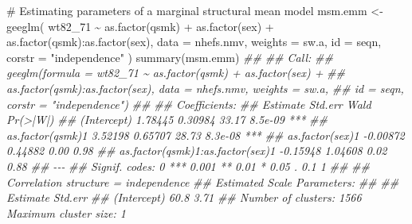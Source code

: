 \documentclass[
  10pt,
  a4paper,
]{book}
\newenvironment{Shaded}{\begin{snugshade}}{\end{snugshade}}
\newcommand{\AttributeTok}[1]{\textcolor[rgb]{0.40,0.45,0.13}{#1}}
\newcommand{\CommentTok}[1]{\textcolor[rgb]{0.37,0.37,0.37}{#1}}
\newcommand{\DocumentationTok}[1]{\textcolor[rgb]{0.37,0.37,0.37}{\textit{#1}}}
\newcommand{\FunctionTok}[1]{\textcolor[rgb]{0.28,0.35,0.67}{#1}}
\newcommand{\NormalTok}[1]{\textcolor[rgb]{0.00,0.46,0.62}{#1}}
\newcommand{\OtherTok}[1]{\textcolor[rgb]{0.00,0.46,0.62}{#1}}
\newcommand{\SpecialCharTok}[1]{\textcolor[rgb]{0.37,0.37,0.37}{#1}}
\newcommand{\StringTok}[1]{\textcolor[rgb]{0.13,0.47,0.30}{#1}}
\begin{document}
\begin{Shaded}
\begin{Highlighting}[]
\CommentTok{\# Estimating parameters of a marginal structural mean model}
\NormalTok{msm.emm }\OtherTok{\textless{}{-}} \FunctionTok{geeglm}\NormalTok{(}
\NormalTok{  wt82\_71 }\SpecialCharTok{\textasciitilde{}} \FunctionTok{as.factor}\NormalTok{(qsmk) }\SpecialCharTok{+} \FunctionTok{as.factor}\NormalTok{(sex)}
  \SpecialCharTok{+} \FunctionTok{as.factor}\NormalTok{(qsmk)}\SpecialCharTok{:}\FunctionTok{as.factor}\NormalTok{(sex),}
  \AttributeTok{data =}\NormalTok{ nhefs.nmv,}
  \AttributeTok{weights =}\NormalTok{ sw.a,}
  \AttributeTok{id =}\NormalTok{ seqn,}
  \AttributeTok{corstr =} \StringTok{"independence"}
\NormalTok{)}
\FunctionTok{summary}\NormalTok{(msm.emm)}
\DocumentationTok{\#\# }
\DocumentationTok{\#\# Call:}
\DocumentationTok{\#\# geeglm(formula = wt82\_71 \textasciitilde{} as.factor(qsmk) + as.factor(sex) + }
\DocumentationTok{\#\#     as.factor(qsmk):as.factor(sex), data = nhefs.nmv, weights = sw.a, }
\DocumentationTok{\#\#     id = seqn, corstr = "independence")}
\DocumentationTok{\#\# }
\DocumentationTok{\#\#  Coefficients:}
\DocumentationTok{\#\#                                  Estimate  Std.err  Wald Pr(\textgreater{}|W|)    }
\DocumentationTok{\#\# (Intercept)                       1.78445  0.30984 33.17  8.5e{-}09 ***}
\DocumentationTok{\#\# as.factor(qsmk)1                  3.52198  0.65707 28.73  8.3e{-}08 ***}
\DocumentationTok{\#\# as.factor(sex)1                  {-}0.00872  0.44882  0.00     0.98    }
\DocumentationTok{\#\# as.factor(qsmk)1:as.factor(sex)1 {-}0.15948  1.04608  0.02     0.88    }
\DocumentationTok{\#\# {-}{-}{-}}
\DocumentationTok{\#\# Signif. codes:  0 \textquotesingle{}***\textquotesingle{} 0.001 \textquotesingle{}**\textquotesingle{} 0.01 \textquotesingle{}*\textquotesingle{} 0.05 \textquotesingle{}.\textquotesingle{} 0.1 \textquotesingle{} \textquotesingle{} 1}
\DocumentationTok{\#\# }
\DocumentationTok{\#\# Correlation structure = independence }
\DocumentationTok{\#\# Estimated Scale Parameters:}
\DocumentationTok{\#\# }
\DocumentationTok{\#\#             Estimate Std.err}
\DocumentationTok{\#\# (Intercept)     60.8    3.71}
\DocumentationTok{\#\# Number of clusters:   1566  Maximum cluster size: 1}


\end{Highlighting}
\end{Shaded}
\end{document}
